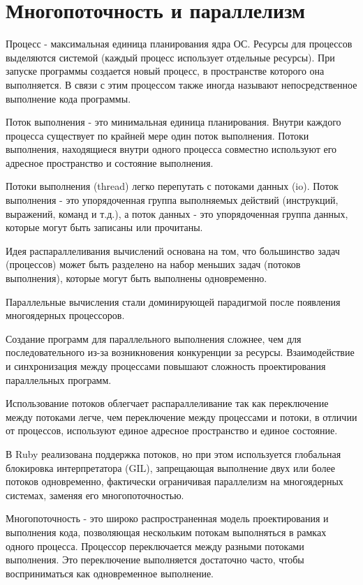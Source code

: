 \chapter{Многопоточность и параллелизм}

Процесс - максимальная единица планирования ядра ОС. Ресурсы для процессов выделяются системой (каждый процесс использует отдельные ресурсы). При запуске программы создается новый процесс, в пространстве которого она выполняется. В связи с этим процессом также иногда называют непосредственное выполнение кода программы.

Поток выполнения - это минимальная единица планирования. Внутри каждого процесса существует по крайней мере один поток выполнения. Потоки выполнения, находящиеся внутри одного процесса совместно используют его адресное пространство и состояние выполнения.

\begin{note}
Потоки выполнения (thread) легко перепутать с потоками данных (io). Поток выполнения - это упорядоченная группа выполняемых действий (инструкций, выражений, команд и т.д.), а поток данных - это упорядоченная группа данных, которые могут быть записаны или прочитаны.
\end{note}

Идея распараллеливания вычислений основана на том, что большинство задач (процессов) может быть разделено на набор меньших задач (потоков выполнения), которые могут быть выполнены одновременно.

Параллельные вычисления стали доминирующей парадигмой после появления многоядерных процессоров.

Создание программ для параллельного выполнения сложнее, чем для последовательного из-за возникновения конкуренции за ресурсы. Взаимодействие и синхронизация между процессами повышают сложность проектирования параллельных программ.

Использование потоков облегчает распараллеливание так как переключение между потоками легче, чем переключение между процессами и потоки, в отличии от процессов, используют единое адресное пространство и единое состояние.

В Ruby реализована поддержка потоков, но при этом используется глобальная блокировка интерпретатора (GIL), запрещающая выполнение двух или более потоков одновременно, фактически ограничивая параллелизм на многоядерных системах, заменяя его многопоточностью.

Многопоточность - это широко распространенная модель проектирования и выполнения кода, позволяющая нескольким потокам выполняться в рамках одного процесса. Процессор переключается между разными потоками выполнения. Это переключение выполняется достаточно часто, чтобы восприниматься как одновременное выполнение.

